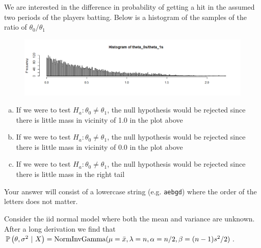 \documentclass[12pt,landscape]{article}
\newcommand{\instr}{\small Your answer will consist of a lowercase string (e.g. \texttt{aebgd}) where the order of the letters does not matter. \normalsize}
\begin{document}

\problem{}  We are interested in the difference in probability of getting a hit in the assumed two periods of the players batting. Below is a histogram of the samples of the ratio of $\theta_0 / \theta_1$

\vspace{-0.3cm}
\begin{figure}[h]
\centering
\includegraphics[width=8in]{ratio.png}
\end{figure}

\vspace{-1.2cm}\benum{} 

\begin{enumerate}[(a)]
\item If we were to test $H_a: \theta_0 \neq \theta_1$, the null hypothesis would be rejected since there is little mass in vicinity of 1.0 in the plot above
\item If we were to test $H_a: \theta_0 \neq \theta_1$, the null hypothesis would be rejected since there is little mass in vicinity of 0.0 in the plot above
\item If we were to test $H_a: \theta_0 \neq \theta_1$, the null hypothesis would be rejected since there is little mass in the right tail
\end{enumerate}
\eenum\instr\pagebreak



\problem{} Consider the iid normal model where both the mean and variance are unknown. After a long derivation we find that $\mathbb{P}\left(\theta, \sigma^2~|~X\right) = \text{NormInvGamma}(\mu = \bar{x}, \lambda = n, \alpha = n/2, \beta = (n-1)s^2 / 2)$.

\vspace{-0.2cm}\benum{} 
\end{document}
